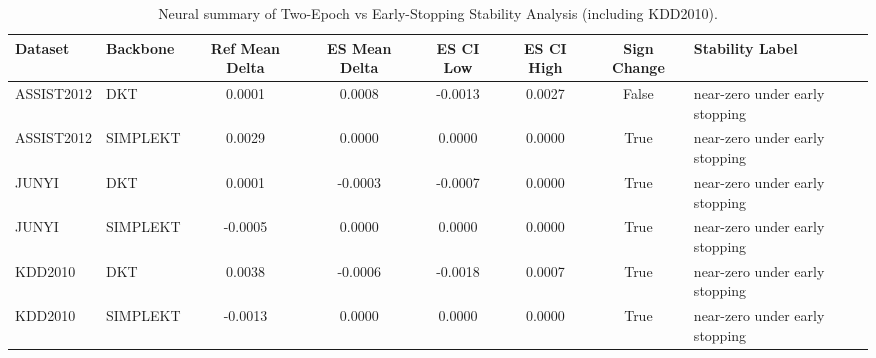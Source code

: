 \begin{table}[h]
\centering
\caption{Neural summary of Two-Epoch vs Early-Stopping Stability Analysis (including KDD2010).}
\label{tab:neural_summary_two_epoch_vs_early_stopping}
\begin{tabular}{llcccccl}
\toprule
Dataset & Backbone & Ref Mean Delta & ES Mean Delta & ES CI Low & ES CI High & Sign Change & Stability Label \\
\midrule
ASSIST2012 & DKT & 0.0001 & 0.0008 & -0.0013 & 0.0027 & False & near-zero under early stopping \\
ASSIST2012 & SIMPLEKT & 0.0029 & 0.0000 & 0.0000 & 0.0000 & True & near-zero under early stopping \\
JUNYI & DKT & 0.0001 & -0.0003 & -0.0007 & 0.0000 & True & near-zero under early stopping \\
JUNYI & SIMPLEKT & -0.0005 & 0.0000 & 0.0000 & 0.0000 & True & near-zero under early stopping \\
KDD2010 & DKT & 0.0038 & -0.0006 & -0.0018 & 0.0007 & True & near-zero under early stopping \\
KDD2010 & SIMPLEKT & -0.0013 & 0.0000 & 0.0000 & 0.0000 & True & near-zero under early stopping \\
\bottomrule
\end{tabular}
\end{table}

